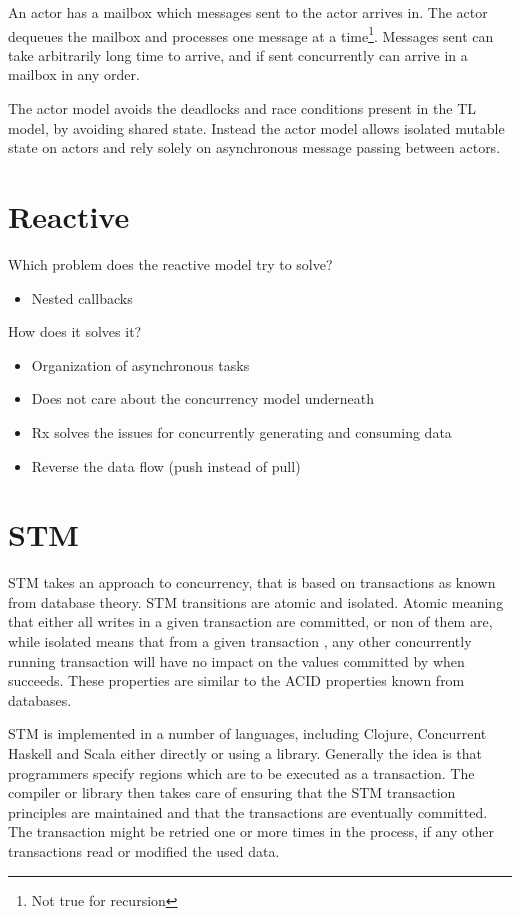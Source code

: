 An actor has a mailbox which messages sent to the actor arrives in. The actor dequeues the mailbox and processes one message at a time\footnote{Not true for recursion}. Messages sent can take arbitrarily long time to arrive, and if sent concurrently can arrive in a mailbox in any order\cite{hewitt2014actor}.

The actor model avoids the deadlocks and race conditions present in the \ac{TL} model, by avoiding shared state\citep[Chap. 32]{odersky2011programming}. Instead the actor model allows isolated mutable state on actors and rely solely on asynchronous message passing between actors.



\section{Reactive}

Which problem does the reactive model try to solve?
\begin{itemize}
\item Nested callbacks
\end{itemize}

How does it solves it?
\begin{itemize}
\item Organization of asynchronous tasks
\item Does not care about the concurrency model underneath
\item Rx solves the issues for concurrently generating and consuming data
\item Reverse the data flow (push instead of pull)
\end{itemize}

\section{\acl{STM}}
\ac{STM} takes an approach to concurrency, that is based on transactions as known from database theory\cite[p. 1]{shavit1997software}. \ac{STM} transitions are atomic and isolated. Atomic meaning that either all writes in a given transaction are committed, or non of them are, while isolated means that from a given transaction , any other concurrently running transaction will have no impact on the values committed by  when  succeeds\cite[p. 102]{sevenModels}. These properties are similar to the \ac{ACID} properties known from databases\cite[p. 754]{elmasri2011fundamentals}.

\ac{STM} is implemented in a number of languages, including Clojure\cite[p. 101]{sevenModels}, Concurrent Haskell\cite{harris2005composable} and Scala\cite{goodman2011muts} either directly or using a library. Generally the idea is that programmers specify regions which are to be executed as a transaction. The compiler or library then takes care of ensuring that the \ac{STM} transaction principles are maintained and that the transactions are eventually committed\cite[p. 1]{saha2006mcrt}. The transaction might be retried one or more times in the process, if any other transactions read or modified the used data.

